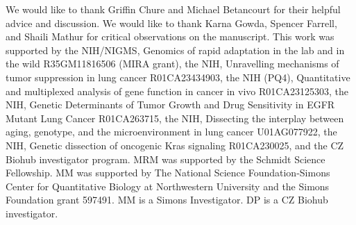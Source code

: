 \documentclass[
]{scrartcl}
\begin{document}
\begin{refsegment}
We would like to thank Griffin Chure and Michael Betancourt for their
helpful advice and discussion. We would like to thank Karna Gowda,
Spencer Farrell, and Shaili Mathur for critical observations on the
manuscript. This work was supported by the NIH/NIGMS, Genomics of rapid
adaptation in the lab and in the wild R35GM11816506 (MIRA grant), the
NIH, Unravelling mechanisms of tumor suppression in lung cancer
R01CA23434903, the NIH (PQ4), Quantitative and multiplexed analysis of
gene function in cancer in vivo R01CA23125303, the NIH, Genetic
Determinants of Tumor Growth and Drug Sensitivity in EGFR Mutant Lung
Cancer R01CA263715, the NIH, Dissecting the interplay between aging,
genotype, and the microenvironment in lung cancer U01AG077922, the NIH,
Genetic dissection of oncogenic Kras signaling R01CA230025, and the CZ
Biohub investigator program. MRM was supported by the Schmidt Science
Fellowship. MM was supported by The National Science Foundation-Simons
Center for Quantitative Biology at Northwestern University and the
Simons Foundation grant 597491. MM is a Simons Investigator. DP is a CZ
Biohub investigator.


\printbibliography[segment=\therefsegment]
\end{refsegment}

\clearpage


\end{document}
